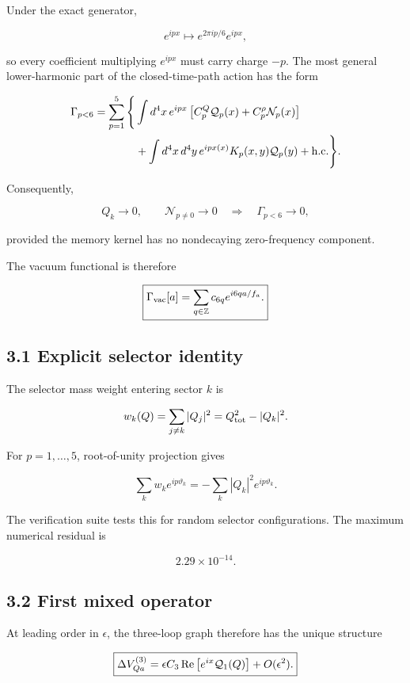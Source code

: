 \documentclass[
  10pt,
]{article}
\begin{document}
Under the exact generator,

\[
e^{ipx}\mapsto e^{2\pi ip/6}e^{ipx},
\]

so every coefficient multiplying \(e^{ipx}\) must carry charge \(-p\).
The most general lower-harmonic part of the closed-time-path action has
the form

\[
\begin{aligned}
\Gamma_{p<6}
=
\sum_{p=1}^{5}
\Bigg\{&\int d^4x\,e^{ipx}
\left[
C_p^Q\mathcal Q_p(x)
+C_p^\rho\mathcal N_p(x)
\right]
\\
&+
\int d^4x\,d^4y\,
 e^{ipx(x)}K_p(x,y)\mathcal Q_p(y)
+{\rm h.c.}
\Bigg\}.
\end{aligned}
\]

Consequently,

\[
Q_k\to0,
\qquad
\mathcal N_{p\ne0}\to0
\quad\Longrightarrow\quad
\Gamma_{p<6}\to0,
\]

provided the memory kernel has no nondecaying zero-frequency component.

The vacuum functional is therefore

\[
\boxed{
\Gamma_{\rm vac}[a]
=
\sum_{q\in\mathbb Z}c_{6q}e^{i6qa/f_a}.}
\]

\subsection{3.1 Explicit selector
identity}\label{explicit-selector-identity}

The selector mass weight entering sector \(k\) is

\[
w_k(Q)=\sum_{j\ne k}|Q_j|^2
=Q_{\rm tot}^2-|Q_k|^2.
\]

For \(p=1,\ldots,5\), root-of-unity projection gives

\[
\sum_kw_ke^{ip\vartheta_k}
=
-\sum_k|Q_k|^2e^{ip\vartheta_k}.
\]

The verification suite tests this for random selector configurations.
The maximum numerical residual is

\[
2.29\times10^{-14}.
\]

\subsection{3.2 First mixed operator}\label{first-mixed-operator}

At leading order in \(\epsilon\), the three-loop graph therefore has the
unique structure

\[
\boxed{
\Delta V_{Qa}^{(3)}
=
\epsilon C_3\,
{\rm Re}\left[e^{ix}\mathcal Q_1(Q)\right]
+O(\epsilon^2).}
\]
\end{document}
